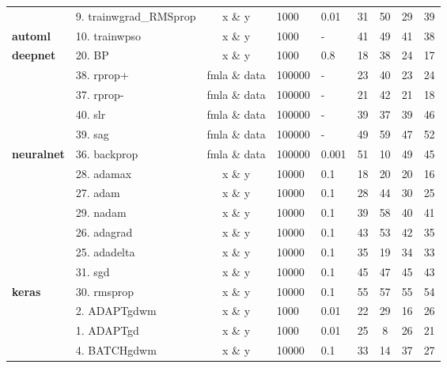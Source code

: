 \begin{Schunk}
\begin{table}[!h]
\begin{tabular}[t]{>{}llcllcccc}
 & 9. trainwgrad\_RMSprop & x \& y & 1000 & 0.01 & 31 & 50 & 29 & 39\\

\multirow{-3}{*}{\raggedright\arraybackslash \textbf{automl}} & 10. trainwpso & x \& y & 1000 & - & 41 & 49 & 41 & 38\\
\cmidrule{1-9}
\textbf{deepnet} & 20. BP & x \& y & 1000 & 0.8 & 18 & 38 & 24 & 17\\
\cmidrule{1-9}
 & 38. rprop+ & fmla \& data & 100000 & - & 23 & 40 & 23 & 24\\

 & 37. rprop- & fmla \& data & 100000 & - & 21 & 42 & 21 & 18\\

 & 40. slr & fmla \& data & 100000 & - & 39 & 37 & 39 & 46\\

 & 39. sag & fmla \& data & 100000 & - & 49 & 59 & 47 & 52\\

\multirow{-5}{*}{\raggedright\arraybackslash \textbf{neuralnet}} & 36. backprop & fmla \& data & 100000 & 0.001 & 51 & 10 & 49 & 45\\
\cmidrule{1-9}
 & 28. adamax & x \& y & 10000 & 0.1 & 18 & 20 & 20 & 16\\

 & 27. adam & x \& y & 10000 & 0.1 & 28 & 44 & 30 & 25\\

 & 29. nadam & x \& y & 10000 & 0.1 & 39 & 58 & 40 & 41\\

 & 26. adagrad & x \& y & 10000 & 0.1 & 43 & 53 & 42 & 35\\

 & 25. adadelta & x \& y & 10000 & 0.1 & 35 & 19 & 34 & 33\\

 & 31. sgd & x \& y & 10000 & 0.1 & 45 & 47 & 45 & 43\\

\multirow{-7}{*}{\raggedright\arraybackslash \textbf{keras}} & 30. rmsprop & x \& y & 10000 & 0.1 & 55 & 57 & 55 & 54\\
\cmidrule{1-9}
 & 2. ADAPTgdwm & x \& y & 1000 & 0.01 & 22 & 29 & 16 & 26\\

 & 1. ADAPTgd & x \& y & 1000 & 0.01 & 25 & 8 & 26 & 21\\

 & 4. BATCHgdwm & x \& y & 10000 & 0.1 & 33 & 14 & 37 & 27\\


\end{tabular}
\end{table}
\end{Schunk}
